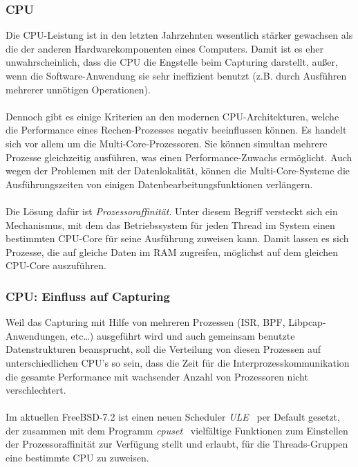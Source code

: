 {\subsubsection{CPU}\label{sec:cpu}
Die CPU-Leistung ist in den letzten Jahrzehnten wesentlich stärker
gewachsen als die der anderen Hardwarekomponenten eines Computers. 
Damit ist es eher unwahrscheinlich, dass die CPU die
Engstelle beim Capturing darstellt, außer, wenn die 
Software-Anwendung sie sehr ineffizient
benutzt (z.B. durch Ausführen mehrerer unnötigen Operationen).\\\\
%
Dennoch gibt es einige Kriterien an den modernen CPU-Architekturen, welche die
Performance eines Rechen-Prozesses negativ beeinflussen können. Es handelt sich
vor allem um die Multi-Core-Prozessoren. Sie können simultan mehrere Prozesse
gleichzeitig ausführen, was einen Performance-Zuwachs ermöglicht. Auch
wegen der Problemen mit der Datenlokalität, können die Multi-Core-Systeme die
Ausführungszeiten von einigen Datenbearbeitungsfunktionen verlängern.\\\\
%
Die Lösung dafür ist \emph{Prozessoraffinität}. Unter diesem Begriff versteckt
sich ein Mechanismus, mit dem das Betriebssystem für jeden Thread im System einen 
bestimmten CPU-Core für seine Ausführung zuweisen kann. Damit lassen es sich 
Prozesse, die auf gleiche Daten im RAM zugreifen, möglichst auf dem gleichen 
CPU-Core auszuführen.
%
\subsubsection*{CPU: Einfluss auf  Capturing}\label{sec:cpu_einfl_auf_cap}
Weil das Capturing mit Hilfe von mehreren Prozessen (ISR, BPF,
Libpcap-Anwendungen, etc\ldots) ausgeführt wird und auch gemeinsam
benutzte Datenstrukturen beansprucht, soll die Verteilung von diesen Prozessen
auf unterschiedlichen CPU's so sein, dass die Zeit für die
Interprozesskommunikation die gesamte Performance mit wachsender Anzahl 
von Prozessoren nicht verschlechtert.\\\\
%
Im aktuellen FreeBSD-7.2 ist einen neuen Scheduler \emph{ULE}~\cite{bsd_ule} per
Default gesetzt, der zusammen mit dem Programm \emph{cpuset}~\cite{man_cpuset}
vielfältige Funktionen zum Einstellen der Prozessoraffinität zur Verfügung stellt und
erlaubt, für die Threads-Gruppen eine bestimmte CPU zu zuweisen.

}
